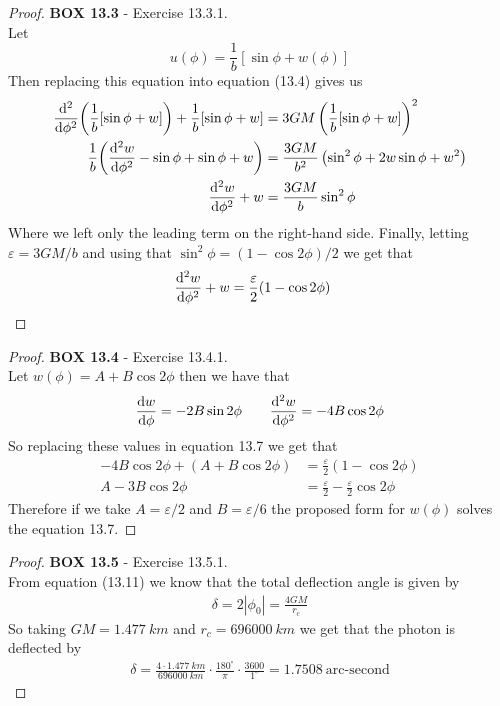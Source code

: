 \documentclass[11pt]{article}
\theoremstyle{definition}
\begin{document}
\begin{proof}{\textbf{BOX 13.3} - Exercise 13.3.1.}\\
Let $$u(\phi) = \frac{1}{b}[\sin\phi + w(\phi)]$$
Then replacing this equation into equation (13.4) gives us
\begin{align*}
    \dv[2]{\phi}(\frac{1}{b}[\sin\phi + w]) + \frac{1}{b}[\sin\phi + w]
    &= 3GM\left(\frac{1}{b}[\sin\phi + w]\right)^2\\
    \frac{1}{b} \bigg(\dv[2]{w}{\phi} - \sin\phi + \sin\phi + w\bigg)
    &= \frac{3GM}{b^2}\left(\sin^2\phi + 2w\sin\phi + w^2\right)\\
    \dv[2]{w}{\phi} + w &= \frac{3GM}{b}\sin^2\phi
\end{align*}
Where we left only the leading term on the right-hand side.
Finally, letting $\varepsilon = 3GM/b$ and using that
$\sin^2\phi = (1 - \cos{2\phi})/2$ we get that
\begin{align*}
    \dv[2]{w}{\phi} + w &= \frac{\varepsilon}{2}(1 - \cos 2\phi)
\end{align*}
\end{proof}
\begin{proof}{\textbf{BOX 13.4} - Exercise 13.4.1.}\\
Let $w(\phi) = A + B \cos 2\phi$ then we have that
\begin{align*}
    \dv{w}{\phi} = -2B\sin 2\phi \qquad \dv[2]{w}{\phi} = -4B\cos 2\phi
\end{align*}
So replacing these values in equation 13.7 we get that
\begin{align*}
    -4B\cos 2\phi + (A + B \cos 2\phi) &= \frac{\varepsilon}{2}(1 - \cos 2\phi)\\
    A - 3B\cos 2\phi &= \frac{\varepsilon}{2} - \frac{\varepsilon}{2}\cos 2\phi
\end{align*}
Therefore if we take $A = \varepsilon/2$ and $B = \varepsilon/6$ the proposed
form for $w(\phi)$ solves the equation 13.7. 
\end{proof}
\begin{proof}{\textbf{BOX 13.5} - Exercise 13.5.1.}\\
From equation (13.11) we know that the total deflection angle is given by
\begin{align*}
    \delta = 2|\phi_0| = \frac{4GM}{r_c}
\end{align*}
So taking $GM = 1.477~km$ and $r_c = 696000~km$ we get that the photon is
deflected by
\begin{align*}
    \delta = \frac{4\cdot 1.477~km}{696000~km} \cdot \frac{180^\circ}{\pi}
    \cdot \frac{3600}{1^\circ}
    = 1.7508~\text{arc-second}
\end{align*}
\end{proof}
\end{document}
